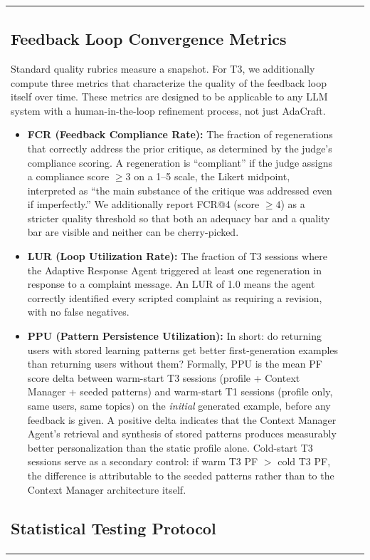 \documentclass[conference]{IEEEtran}
\begin{document}
\begin{table}[htbp]
\begin{center}
\begin{tabular}{lll}
\subsection{Feedback Loop Convergence Metrics}

Standard quality rubrics measure a snapshot. For T3, we additionally compute three metrics that characterize the quality of the feedback loop itself over time. These metrics are designed to be applicable to any LLM system with a human-in-the-loop refinement process, not just AdaCraft.

\begin{itemize}
    \item \textbf{FCR (Feedback Compliance Rate):} The fraction of regenerations that correctly address the prior critique, as determined by the judge's compliance scoring. A regeneration is ``compliant'' if the judge assigns a compliance score $\geq 3$ on a 1--5 scale, the Likert midpoint, interpreted as ``the main substance of the critique was addressed even if imperfectly.'' We additionally report FCR@4 (score $\geq 4$) as a stricter quality threshold so that both an adequacy bar and a quality bar are visible and neither can be cherry-picked.
    \item \textbf{LUR (Loop Utilization Rate):} The fraction of T3 sessions where the Adaptive Response Agent triggered at least one regeneration in response to a complaint message. An LUR of 1.0 means the agent correctly identified every scripted complaint as requiring a revision, with no false negatives.
    \item \textbf{PPU (Pattern Persistence Utilization):} In short: do returning users with stored learning patterns get better first-generation examples than returning users without them? Formally, PPU is the mean PF score delta between warm-start T3 sessions (profile + Context Manager + seeded patterns) and warm-start T1 sessions (profile only, same users, same topics) on the \textit{initial} generated example, before any feedback is given. A positive delta indicates that the Context Manager Agent's retrieval and synthesis of stored patterns produces measurably better personalization than the static profile alone. Cold-start T3 sessions serve as a secondary control: if warm T3 PF $>$ cold T3 PF, the difference is attributable to the seeded patterns rather than to the Context Manager architecture itself.
\end{itemize}

\subsection{Statistical Testing Protocol}


\end{tabular}
\end{center}
\end{table}
\end{document}
